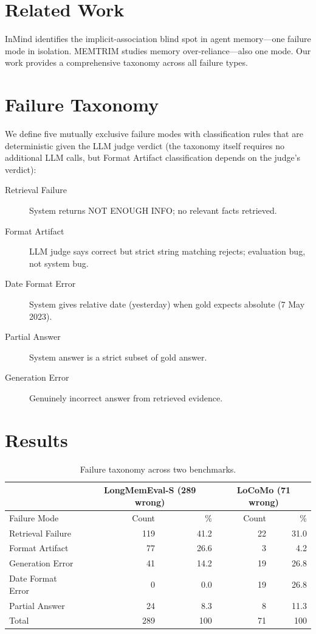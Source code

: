 ﻿\documentclass{article}
\begin{document}
\section{Related Work}

InMind identifies the implicit-association blind spot in agent memory---one failure mode in isolation. MEMTRIM studies memory over-reliance---also one mode. Our work provides a comprehensive taxonomy across all failure types.

\section{Failure Taxonomy}

We define five mutually exclusive failure modes with classification rules that are deterministic given the LLM judge verdict (the taxonomy itself requires no additional LLM calls, but Format Artifact classification depends on the judge's verdict):

\begin{description}
\item[Retrieval Failure] System returns NOT ENOUGH INFO; no relevant facts retrieved.
\item[Format Artifact] LLM judge says correct but strict string matching rejects; evaluation bug, not system bug.
\item[Date Format Error] System gives relative date (yesterday) when gold expects absolute (7 May 2023).
\item[Partial Answer] System answer is a strict subset of gold answer.
\item[Generation Error] Genuinely incorrect answer from retrieved evidence.
\end{description}

\section{Results}

\begin{table}[h]
\centering
\caption{Failure taxonomy across two benchmarks.}
\begin{tabular}{lrrrr}
\toprule
 & \multicolumn{2}{c}{LongMemEval-S (289 wrong)} & \multicolumn{2}{c}{LoCoMo (71 wrong)} \\
\midrule
Failure Mode & Count & \% & Count & \% \\
\midrule
Retrieval Failure & 119 & 41.2 & 22 & 31.0 \\
Format Artifact & 77 & 26.6 & 3 & 4.2 \\
Generation Error & 41 & 14.2 & 19 & 26.8 \\
Date Format Error & 0 & 0.0 & 19 & 26.8 \\
Partial Answer & 24 & 8.3 & 8 & 11.3 \\
\midrule
Total & 289 & 100 & 71 & 100 \\
\bottomrule
\end{tabular}
\end{table}
\end{document}
